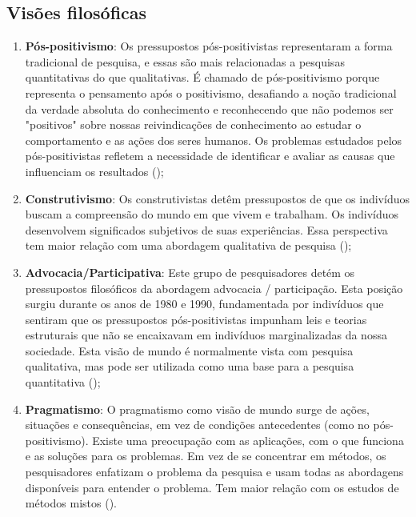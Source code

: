 \subsection{Visões filosóficas}

\begin{enumerate}
    \item \textbf{Pós-positivismo}: Os pressupostos pós-positivistas representaram a forma tradicional de pesquisa, e essas são mais relacionadas a pesquisas quantitativas do que qualitativas. É chamado de pós-positivismo porque representa o pensamento após o positivismo, desafiando a noção tradicional da verdade absoluta do conhecimento e reconhecendo que não podemos ser "positivos" sobre nossas reivindicações de conhecimento ao estudar o comportamento e as ações dos seres humanos. Os problemas estudados pelos pós-positivistas refletem a necessidade de identificar e avaliar as causas que influenciam os resultados (\cite{creswell_research_2014});

    \item \textbf{Construtivismo}: Os construtivistas detêm pressupostos de que os indivíduos buscam a compreensão do mundo em que vivem e trabalham. Os indivíduos desenvolvem significados subjetivos de suas experiências. Essa perspectiva tem maior relação com uma abordagem qualitativa de pesquisa (\cite{creswell_research_2014});
    
    \item \textbf{Advocacia/Participativa}: Este grupo de pesquisadores detém os pressupostos filosóficos da abordagem advocacia / participação. Esta posição surgiu durante os anos de 1980 e 1990, fundamentada por indivíduos que sentiram que os pressupostos pós-positivistas impunham leis e teorias estruturais que não se encaixavam em indivíduos marginalizadas da nossa sociedade. Esta visão de mundo é normalmente vista com pesquisa qualitativa, mas pode ser utilizada como uma base para a pesquisa quantitativa (\cite{creswell_research_2014});
    
    \item \textbf{Pragmatismo}: O pragmatismo como visão de mundo surge de ações, situações e consequências, em vez de condições antecedentes (como no pós-positivismo). Existe uma preocupação com as aplicações, com o que funciona e as soluções para os problemas. Em vez de se concentrar em métodos, os pesquisadores enfatizam o problema da pesquisa e usam todas as abordagens disponíveis para entender o problema. Tem maior relação com os estudos de métodos mistos (\cite{creswell_research_2014}).
\end{enumerate}

